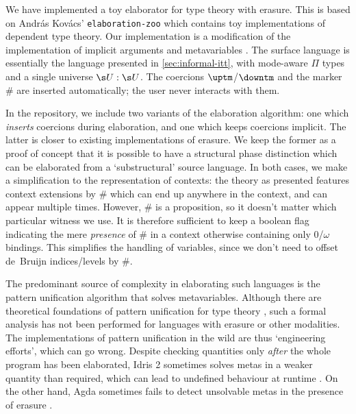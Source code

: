 \documentclass[a4paper,UKenglish,cleveref,autoref,thm-restate]{lipics-v2021}
\begin{document}
We have implemented a toy elaborator for type theory
with erasure. This is based on Andr\'as Kov\'acs' \texttt{elaboration-zoo} which
contains toy implementations of dependent type theory. Our implementation is a
modification of the implementation of implicit arguments and metavariables
\cite{KovacsUnknown-sx}. The surface language is essentially the
language presented in \cref{sec:informal-itt}, with mode-aware $\Pi$ types and a
single universe $\s U : \s U$. The coercions $\uptm$/$\downtm$ and the marker
$\#$ are inserted automatically; the user never interacts with them.

In the repository, we include two variants of the elaboration algorithm: one
which \emph{inserts} coercions during elaboration, and one which keeps coercions
implicit. The latter is closer to existing implementations of
erasure. We keep the former as a proof of concept that it is possible to have a
structural phase distinction which can be elaborated from a `substructural'
source language. In both cases, we make a simplification to the representation
of contexts: the theory \ZTT as presented features context extensions by $\#$
which can end up anywhere in the context, and can appear multiple times.
However, $\#$ is a proposition, so it doesn't matter which particular witness we
use. It is therefore sufficient to keep a boolean flag indicating the mere
\emph{presence} of $\#$ in a context otherwise containing only 0/$\omega$
bindings. This simplifies the handling of variables, since we don't need to
offset de~Bruijn indices/levels by $\#$.

The predominant source of complexity in elaborating such languages is the
pattern unification algorithm that solves metavariables. Although there are
theoretical foundations of pattern unification for type theory
\cite{Abel2011-sx}, such a formal analysis has not been performed for languages
with erasure or other modalities. The implementations of pattern unification in
the wild are thus `engineering efforts', which can go wrong. Despite checking
quantities only \emph{after} the whole program has been elaborated, Idris 2
sometimes solves metas in a weaker quantity than required, which can lead to
undefined behaviour at runtime \cite{Dunham2024-up}. On the other hand, Agda
sometimes fails to detect unsolvable metas in the presence of erasure
\cite{Cockx2021-mq}. 
\end{document}
